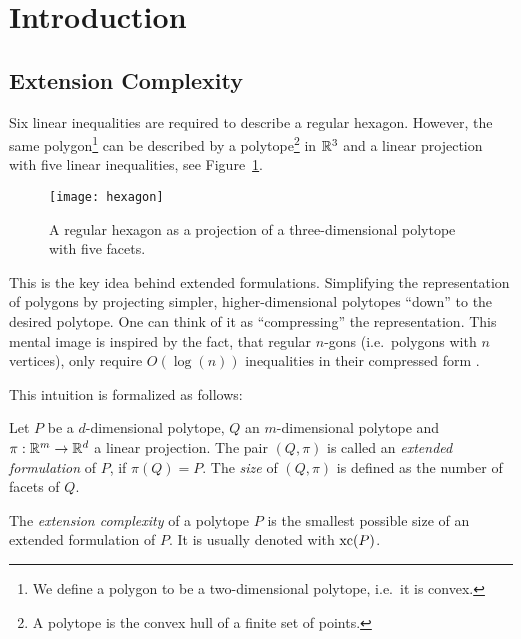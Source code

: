 \section{Introduction}

\subsection{Extension Complexity}

Six linear inequalities are required to describe a regular hexagon. However, the same polygon\footnote{We define a polygon to be a two-dimensional polytope, i.e.\ it is convex.} can be described by a polytope\footnote{A polytope is the convex hull of a finite set of points.} in $\mathbb{R}^3$ and a linear projection with five linear inequalities, see Figure~\ref{fig:hexagon}.

\begin{figure}[ht]
  \centering
  \texttt{[image: hexagon]}
  \caption{A regular hexagon as a projection of a three-dimensional polytope with five facets. \cite[Figure 1]{kwan2020extension}}
  \label{fig:hexagon}
\end{figure}

This is the key idea behind extended formulations. Simplifying the representation of polygons by projecting simpler, higher-dimensional polytopes ``down'' to the desired polytope.
One can think of it as ``compressing'' the representation. This mental image is inspired by the fact, that regular $n$-gons (i.e.\ polygons with $n$ vertices), only require $O(\log(n))$ inequalities in their compressed form \cite{kaibel2010constructing}.

This intuition is formalized as follows:

\begin{definition}
  Let $P$ be a $d$-dimensional polytope, $Q$ an $m$-dimensional polytope and $\pi:\mathbb{R}^m \to \mathbb{R}^d$ a linear projection.
  The pair $(Q,\pi)$ is called an \emph{extended formulation} of $P$, if $\pi(Q)=P$. The \emph{size} of $(Q,\pi)$ is defined as the number of facets of $Q$.
\end{definition}

\begin{definition}
  The \emph{extension complexity} of a polytope $P$ is the smallest possible size of an extended formulation of $P$. It is usually denoted with $\operatorname{xc}(P)$.
\end{definition}

